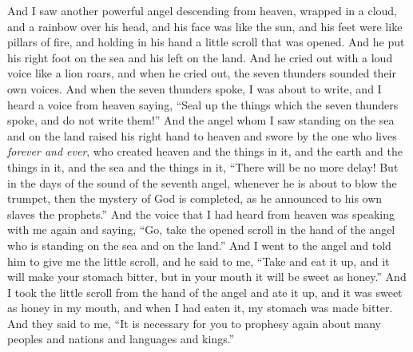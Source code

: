 \begin{biblechapter} %
 And I saw another powerful angel descending from heaven, wrapped in a cloud, and a rainbow over his head, and his face was like the sun, and his feet were like pillars of fire,
\verse and holding in his hand a little scroll that was opened. And he put his right foot on the sea and his left on the land.
\verse And he cried out with a loud voice like a lion roars, and when he cried out, the seven thunders sounded their own voices.
\verse And when the seven thunders spoke, I was about to write, and I heard a voice from heaven saying, “Seal up the things which the seven thunders spoke, and do not write them!”
\verse And the angel whom I saw standing on the sea and on the land raised his right hand to heaven
\verse and swore by the one who lives \textit{forever and ever}, who created heaven and the things in it, and the earth and the things in it, and the sea and the things in it, “There will be no more delay!
\verse But in the days of the sound of the seventh angel, whenever he is about to blow the trumpet, then the mystery of God is completed, as he announced to his own slaves the prophets.”
\verse And the voice that I had heard from heaven was speaking with me again and saying, “Go, take the opened scroll in the hand of the angel who is standing on the sea and on the land.”
\verse And I went to the angel and told him to give me the little scroll, and he said to me, “Take and eat it up, and it will make your stomach bitter, but in your mouth it will be sweet as honey.”
\verse And I took the little scroll from the hand of the angel and ate it up, and it was sweet as honey in my mouth, and when I had eaten it, my stomach was made bitter.
\verse And they said to me, “It is necessary for you to prophesy again about many peoples and nations and languages and kings.”
\end{biblechapter}

